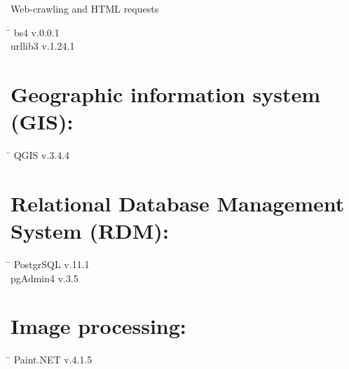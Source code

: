 \begin{large}Web-crawling and HTML requests\end{large}
 \begin{tabbing}
  \hspace*{5cm}  \= \kill
   bs4 \> v.0.0.1 \\
   urllib3 \> v.1.24.1 \\
 \end{tabbing}
 
 \section*{Geographic information system (GIS):}
  \begin{tabbing}
  \hspace*{5cm}  \= \kill
   QGIS \> v.3.4.4
 \end{tabbing}
 \section*{Relational Database Management System (RDM):}
  \begin{tabbing}
  \hspace*{5cm}  \= \kill
   PostgrSQL \> v.11.1 \\
   pgAdmin4 \> v.3.5
 \end{tabbing}
 
 \section*{Image processing:}
  \begin{tabbing}
  \hspace*{5cm}  \= \kill
   Paint.NET \> v.4.1.5
 \end{tabbing}

 
 
 
 
 
 
 
 
 
 
 
 
 
 
 
 

